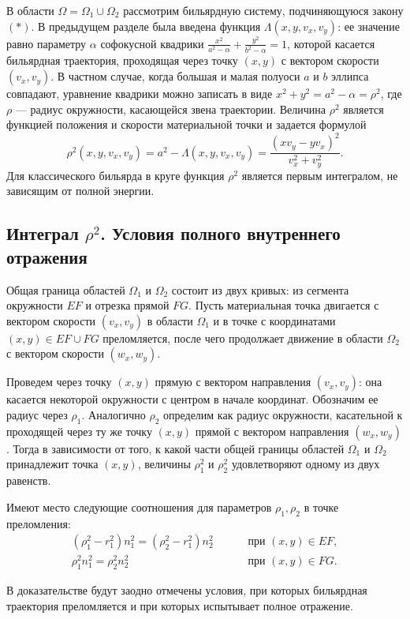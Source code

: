 В области $\Omega = \Omega_1 \cup \Omega_2$ рассмотрим бильярдную систему, подчиняющуюся закону $(\ast)$.
В предыдущем разделе была введена функция $\Lambda(x,y,v_x, v_y)$: ее значение равно параметру $\alpha$ софокусной квадрики $\frac{x^2}{a^2-\alpha} + \frac{y^2}{b^2-\alpha} = 1$, которой касается бильярдная траектория, проходящая через точку $(x,y)$ с вектором скорости $(v_x, v_y)$.
В частном случае, когда большая и малая полуоси $a$ и $b$ эллипса  совпадают, уравнение квадрики можно записать в виде $x^2 + y^2 = a^2-\alpha = \rho^2$, где $\rho$ --- радиус окружности, касающейся звена траектории.
Величина $\rho^2$ является функцией положения и скорости материальной точки и задается формулой $$\rho^2(x,y,v_x,v_y) = a^2 - \Lambda(x, y, v_x, v_y) = \frac{(x v_y - y v_x)^2}{v_x^2 + v_y^2}.$$
Для классического бильярда в круге  функция $\rho^2$ является первым интегралом, не зависящим от полной энергии.

\subsection{Интеграл $\rho^2$. Условия полного внутреннего отражения}\label{sec:ch4/sec3/subsec2}
Общая граница областей $\Omega_1$ и $\Omega_2$ состоит из двух кривых: из сегмента окружности $EF$ и отрезка прямой $FG$. 
Пусть материальная точка двигается с вектором скорости $(v_x, v_y)$ в области $\Omega_1$ и в точке с координатами $(x,y) \in EF \cup FG$ преломляется, после чего продолжает движение в области $\Omega_2$ с вектором скорости $(w_x, w_y)$. 

Проведем через точку $(x,y)$ прямую с вектором направления $(v_x, v_y)$: она касается некоторой окружности с центром в начале координат. Обозначим ее радиус через $\rho_1$. Аналогично $\rho_2$ определим как радиус окружности, касательной к проходящей через ту же точку $(x,y)$ прямой с вектором направления $(w_x, w_y)$.
Тогда в зависимости от того, к какой части общей границы областей $\Omega_1$ и $\Omega_2$  принадлежит точка $(x,y)$, величины $\rho_1^2$ и $\rho_2^2$ удовлетворяют одному из двух равенств. 
\begin{statement}
Имеют место следующие соотношения для параметров $\rho_1, \rho_2$ в точке преломления:
\begin{align}
(\rho_1^2 - r_1^2)n_1^2 = (\rho_2^2 - r_1^2)n_2^2 \qquad & 
			\text{ при } (x,y) \in EF, 
			\label{eq:st1_eq1}
			\\
\rho_1^2 n_1^2 = \rho_2^2 n_2^2 \qquad  & \text{ при } (x,y) \in FG.
			\label{eq:st1_eq2}
\end{align}
\label{st:across_EF}
\end{statement}
\begin{remark}
В доказательстве будут заодно отмечены условия, при которых бильярдная траектория преломляется и при которых испытывает полное  отражение.
\end{remark}


